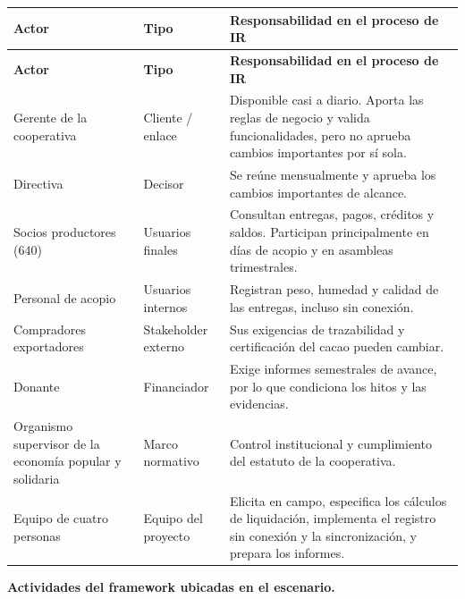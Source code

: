 \documentclass[12pt,a4paper]{article}
\begin{document}
{\small
\setlength{\tabcolsep}{4pt}
\renewcommand{\arraystretch}{1.3}
\begin{longtable}{
|>{\raggedright\arraybackslash}p{}
|>{\raggedright\arraybackslash}p{}
|>{\raggedright\arraybackslash}p{}|}
\hline
\textbf{Actor} & \textbf{Tipo} & \textbf{Responsabilidad en el proceso de IR} \\
\hline
\endfirsthead
\hline
\textbf{Actor} & \textbf{Tipo} & \textbf{Responsabilidad en el proceso de IR} \\
\hline
\endhead
Gerente de la cooperativa & Cliente / enlace & Disponible casi a diario. Aporta las reglas de negocio y valida funcionalidades, pero no aprueba cambios importantes por sí sola. \\
\hline
Directiva & Decisor & Se reúne mensualmente y aprueba los cambios importantes de alcance. \\
\hline
Socios productores (640) & Usuarios finales & Consultan entregas, pagos, créditos y saldos. Participan principalmente en días de acopio y en asambleas trimestrales. \\
\hline
Personal de acopio & Usuarios internos & Registran peso, humedad y calidad de las entregas, incluso sin conexión. \\
\hline
Compradores exportadores & Stakeholder externo & Sus exigencias de trazabilidad y certificación del cacao pueden cambiar. \\
\hline
Donante & Financiador & Exige informes semestrales de avance, por lo que condiciona los hitos y las evidencias. \\
\hline
Organismo supervisor de la economía popular y solidaria & Marco normativo & Control institucional y cumplimiento del estatuto de la cooperativa. \\
\hline
Equipo de cuatro personas & Equipo del proyecto & Elicita en campo, especifica los cálculos de liquidación, implementa el registro sin conexión y la sincronización, y prepara los informes. \\
\hline
\end{longtable}
}

\textbf{Actividades del framework ubicadas en el escenario.}
\end{document}
